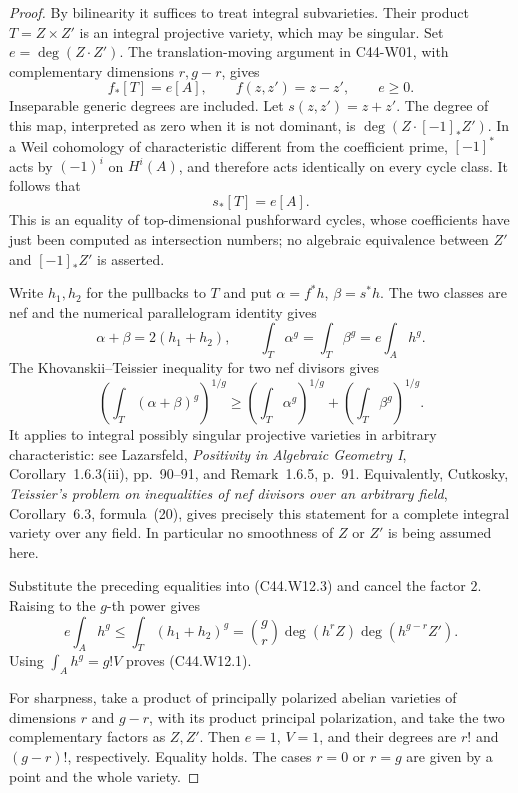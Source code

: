 \documentclass[11pt]{article}
\theoremstyle{remark}\newtheorem{remark}[theorem]{Remark}
\begin{document}
\begin{proof}
By bilinearity it suffices to treat integral subvarieties. Their
product $T=Z\times Z'$ is an integral projective variety, which may
be singular. Set $e=\deg(Z\cdot Z')$. The translation-moving
argument in C44-W01, with complementary dimensions $r,g-r$, gives
\[
 f_*[T]=e[A],\qquad f(z,z')=z-z',\qquad e\geq0.
\]
Inseparable generic degrees are included. Let $s(z,z')=z+z'$.
The degree of this map, interpreted as zero when it is not dominant,
is $\deg(Z\cdot[-1]_*Z')$. In a Weil cohomology of characteristic
different from the coefficient prime, $[-1]^*$ acts by $(-1)^i$
on $H^i(A)$, and therefore acts identically on every cycle class.
It follows that
\[
                         s_*[T]=e[A].
 \tag{C44.W12.2}
\]
This is an equality of top-dimensional pushforward cycles, whose
coefficients have just been computed as intersection numbers; no
algebraic equivalence between $Z'$ and $[-1]_*Z'$ is asserted.

Write $h_1,h_2$ for the pullbacks to $T$ and put
$\alpha=f^*h$, $\beta=s^*h$. The two classes are nef and the
numerical parallelogram identity gives
\[
 \alpha+\beta=2(h_1+h_2),\qquad
 \int_T\alpha^g=\int_T\beta^g=e\int_Ah^g.
\]
The Khovanskii--Teissier inequality for two nef divisors gives
\[
 \left(\int_T(\alpha+\beta)^g\right)^{1/g}
       \geq\left(\int_T\alpha^g\right)^{1/g}
            +\left(\int_T\beta^g\right)^{1/g}.
 \tag{C44.W12.3}
\]
It applies to integral possibly singular projective varieties in
arbitrary characteristic: see Lazarsfeld, \emph{Positivity in
Algebraic Geometry I}, Corollary~1.6.3(iii), pp.~90--91, and
Remark~1.6.5, p.~91. Equivalently, Cutkosky,
\emph{Teissier's problem on inequalities of nef divisors over an
arbitrary field}, Corollary~6.3, formula~(20), gives precisely this
statement for a complete integral variety over any field.
In particular no smoothness of $Z$ or $Z'$ is being assumed here.

Substitute the preceding equalities into (C44.W12.3) and cancel
the factor $2$. Raising to the $g$-th power gives
\[
 e\int_Ah^g\leq\int_T(h_1+h_2)^g
       =\binom gr\deg(h^rZ)\deg(h^{g-r}Z').
\]
Using $\int_Ah^g=g!V$ proves (C44.W12.1).

For sharpness, take a product of principally polarized abelian
varieties of dimensions $r$ and $g-r$, with its product principal
polarization, and take the two complementary factors as $Z,Z'$.
Then $e=1$, $V=1$, and their degrees are $r!$ and $(g-r)!$,
respectively. Equality holds. The cases $r=0$ or $r=g$ are given
by a point and the whole variety.
\end{proof}
\end{document}
